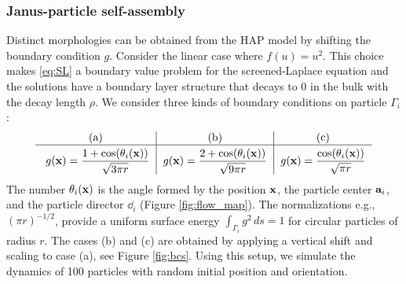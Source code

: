 \subsubsection{Janus-particle self-assembly} 
Distinct morphologies can be obtained from 
the HAP model by shifting the boundary condition $g$.
Consider the linear case where $f(u) = u^2$.
This choice makes \eqref{eq:SL} a boundary value
problem for the screened-Laplace equation
and the solutions have a boundary layer structure that decays to $0$ in the
bulk with the decay length $\rho$.
We consider three kinds of boundary conditions
on particle $\Gamma_i$:
\begin{equation}
  \label{eq:bcs}
  \begin{tabular}{c|c|c}
     \text{(a)} & \text{(b)} & \text{(c)} \\
    \hline
    \rule{0pt}{4ex} 
      $g(\mathbf{x}) = \displaystyle \frac{1+\cos (\theta_i(\xx))}{\sqrt{3\pi r}}$
    & $g(\mathbf{x}) = \displaystyle \frac{2+\cos (\theta_i(\xx))}{\sqrt{9\pi r}}$
    & $g(\mathbf{x}) = \displaystyle \frac{\cos (\theta_i(\xx))}{\sqrt{\pi r}}$
\end{tabular}
\end{equation}
  The number $\theta_i(\xx)$ is the angle formed by the position $\xx$, the
particle center $\aa_i$, and the particle director $\dd_i$ (Figure \ref{fig:flow_map}).
The normalizations e.g., $(\pi r)^{-1/2}$, provide a uniform
surface energy $\int_{\Gamma_i} g^2 \,ds = 1$ for circular particles
of radius $r$. 
The cases (b) and (c) are obtained by applying a vertical shift
and scaling to case (a), see Figure \ref{fig:bcs}.
Using this setup, we simulate the dynamics of 100 particles with random
initial position and orientation.

